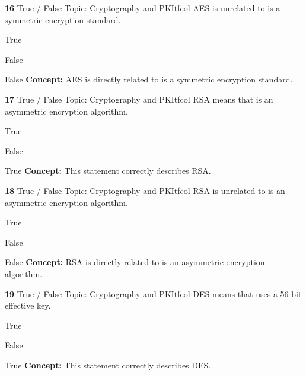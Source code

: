 \documentclass[10pt,a4paper]{article}
\begin{document}
\begin{qcard}{\color{white}\textbf{16} \hfill \small True / False \textbar{} Topic: Cryptography and PKI}{tfcol}
AES is unrelated to is a symmetric encryption standard.

\begin{qoptions}
\item True
\item False
\end{qoptions}
\begin{explainbox}{False}
\textbf{Concept:} AES is directly related to is a symmetric encryption standard.
\end{explainbox}
\end{qcard}

\begin{qcard}{\color{white}\textbf{17} \hfill \small True / False \textbar{} Topic: Cryptography and PKI}{tfcol}
RSA means that is an asymmetric encryption algorithm.

\begin{qoptions}
\item True
\item False
\end{qoptions}
\begin{explainbox}{True}
\textbf{Concept:} This statement correctly describes RSA.
\end{explainbox}
\end{qcard}

\begin{qcard}{\color{white}\textbf{18} \hfill \small True / False \textbar{} Topic: Cryptography and PKI}{tfcol}
RSA is unrelated to is an asymmetric encryption algorithm.

\begin{qoptions}
\item True
\item False
\end{qoptions}
\begin{explainbox}{False}
\textbf{Concept:} RSA is directly related to is an asymmetric encryption algorithm.
\end{explainbox}
\end{qcard}

\begin{qcard}{\color{white}\textbf{19} \hfill \small True / False \textbar{} Topic: Cryptography and PKI}{tfcol}
DES means that uses a 56-bit effective key.

\begin{qoptions}
\item True
\item False
\end{qoptions}
\begin{explainbox}{True}
\textbf{Concept:} This statement correctly describes DES.
\end{explainbox}
\end{qcard}
\end{document}
